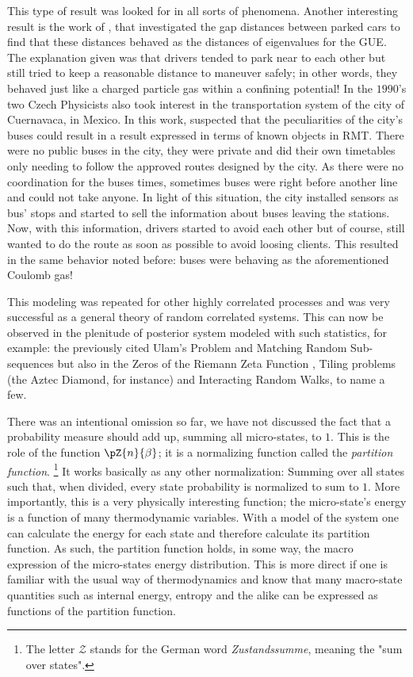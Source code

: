 This type of result was looked for in all sorts of phenomena. Another interesting result is the work of , that investigated the gap distances between parked cars to find that these distances behaved as the distances of eigenvalues for the GUE. The explanation given was that drivers tended to park near to each other but still tried to keep a reasonable distance to maneuver safely; in other words, they behaved just like a charged particle gas within a confining potential! In the $1990$'s two Czech Physicists also took interest in the transportation system of the city of Cuernavaca, in Mexico. In this work,  suspected that the peculiarities of the city's buses could result in a result expressed in terms of known objects in RMT. There were no public buses in the city, they were private and did their own timetables only needing to follow the approved routes designed by the city. As there were no coordination for the buses times, sometimes buses were right before another line and could not take anyone. In light of this situation, the city installed sensors as bus' stops and started to sell the information about buses leaving the stations. Now, with this information, drivers started to avoid each other but of course, still wanted to do the route as soon as possible to avoid loosing clients. This resulted in the same behavior noted before: buses were behaving as the aforementioned Coulomb gas!

This modeling was repeated for other highly correlated processes and was very successful as a general theory of random correlated systems. This can now be observed in the plenitude of posterior system modeled with such statistics, for example: the previously cited Ulam's Problem \cite{Ulam} and Matching Random Sub-sequences \cite{majumdar2007randommatricesulamproblem} but also in the Zeros of the Riemann Zeta Function \cite{Montgomery}, Tiling problems (the Aztec Diamond, for instance) and Interacting Random Walks, to name a few. 

There was an intentional omission so far, we have not discussed the fact that a probability measure should add up, summing all micro-states, to $1$. This is the role of the function $\pZ{n}{\beta}$; it is a normalizing function called the \textit{partition function}. \footnote{The letter $\mathcal{Z}$ stands for the German word \textit{Zustandssumme}, meaning the "sum over states".} It works basically as any other normalization: Summing over all states such that, when divided, every state probability is normalized to sum to $1$. More importantly, this is a very physically interesting function; the micro-state's energy is a function of many thermodynamic variables. With a model of the system one can calculate the energy for each state and therefore calculate its partition function. As such, the partition function holds, in some way, the macro expression of the micro-states energy distribution. This is more direct if one is familiar with the usual way of thermodynamics and know that many macro-state quantities such as internal energy, entropy and the alike can be expressed as functions of the partition function. 

